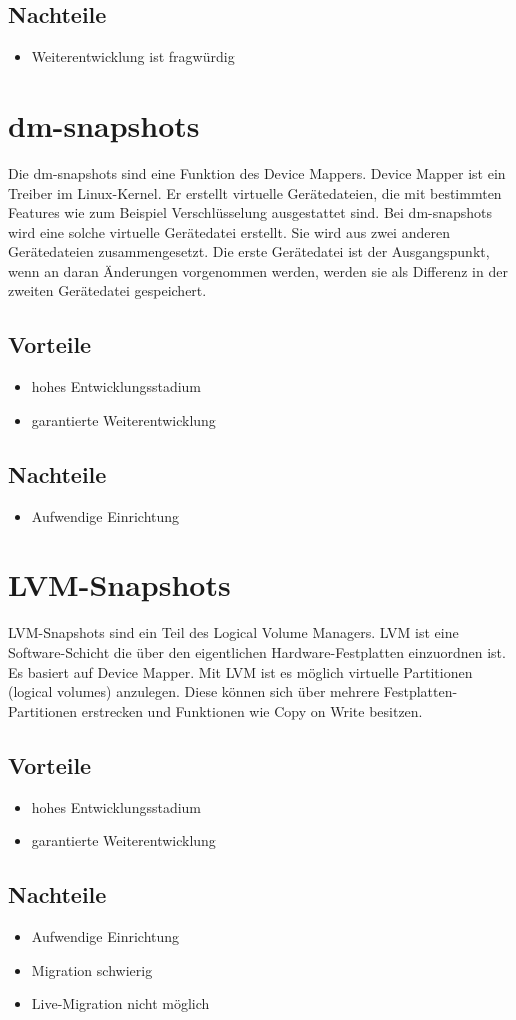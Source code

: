 \subsection{Nachteile}
\begin{itemize}
 \item Weiterentwicklung ist fragwürdig
\end{itemize}

\section{dm-snapshots}
Die dm-snapshots sind eine Funktion des Device Mappers. Device Mapper ist ein Treiber im Linux-Kernel. Er erstellt virtuelle Gerätedateien, die mit bestimmten Features wie zum Beispiel Verschlüsselung ausgestattet sind. Bei dm-snapshots wird eine solche virtuelle Gerätedatei erstellt. Sie wird aus zwei anderen Gerätedateien zusammengesetzt. Die erste Gerätedatei ist der Ausgangspunkt, wenn an daran Änderungen vorgenommen werden, werden sie als Differenz in der zweiten Gerätedatei gespeichert. \cite{dmmbroz} \cite{dmkerneldoc}

\subsection{Vorteile}
\begin{itemize}
 \item hohes Entwicklungsstadium
 \item garantierte Weiterentwicklung
\end{itemize}

\subsection{Nachteile}
\begin{itemize}
 \item Aufwendige Einrichtung
\end{itemize}

\section{LVM-Snapshots}
LVM-Snapshots sind ein Teil des Logical Volume Managers. LVM ist eine Software-Schicht die über den eigentlichen Hardware-Festplatten einzuordnen ist. Es basiert auf Device Mapper. Mit LVM ist es möglich virtuelle Partitionen (logical volumes) anzulegen. Diese können sich über mehrere Festplatten-Partitionen erstrecken und Funktionen wie Copy on Write besitzen. \cite{lvmhowto} \cite{lvmselflinux} \cite{lvmsource}

\subsection{Vorteile}
\begin{itemize}
 \item hohes Entwicklungsstadium
 \item garantierte Weiterentwicklung
\end{itemize}

\subsection{Nachteile}
\begin{itemize}
 \item Aufwendige Einrichtung
 \item Migration schwierig
 \item Live-Migration nicht möglich
\end{itemize}
